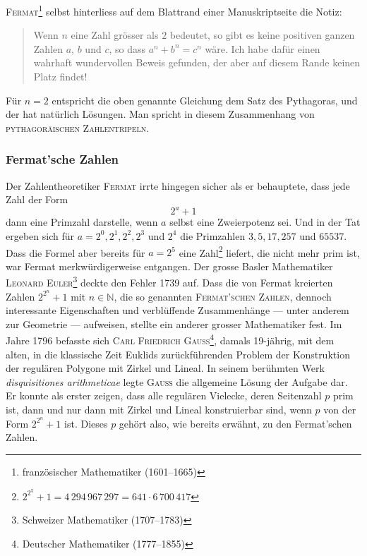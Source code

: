 \documentclass[%
11pt,%
twoside,%
titlepage,%
german,%
headsepline%
]{scrartcl}
\begin{document}
\textsc{Fermat}\footnote{französischer Mathematiker (1601--1665)} selbst hinterliess auf dem Blattrand einer Manuskriptseite die Notiz:
\begin{quote}
    Wenn $n$ eine Zahl grösser als $2$ bedeutet, so gibt es keine positiven ganzen Zahlen $a$, $b$ und $c$, so dass $a^n+b^n=c^n$ wäre. Ich habe dafür einen wahrhaft wundervollen Beweis gefunden, der aber auf diesem Rande keinen Platz findet!
\end{quote}

\begin{bem}
    Für $n=2$ entspricht die oben genannte Gleichung dem Satz des Pythagoras, und der hat natürlich Lösungen. Man spricht in diesem Zusammenhang von \textsc{pythagoräischen Zahlentripeln}.
\end{bem}

\subsubsection{Fermat'sche Zahlen}
Der Zahlentheoretiker \textsc{Fermat} irrte hingegen sicher als er behauptete, dass jede Zahl der Form
$$2^a+1$$
dann eine Primzahl darstelle, wenn $a$ selbst eine Zweierpotenz sei. Und in der Tat ergeben sich für $a=2^0,2^1,2^2,2^3$ und $2^4$ die Primzahlen $3,5,17,257$ und $65537$. Dass die Formel aber bereits für $a=2^5$ eine Zahl\footnote{$2^{2^5}+1=4\,294\,967\,297=641\cdot6\,700\,417$} liefert, die nicht mehr prim ist, war Fermat merkwürdigerweise entgangen. Der grosse Basler Mathematiker \textsc{Leonard Euler}\footnote{Schweizer Mathematiker (1707--1783)} deckte den Fehler 1739 auf. Dass die von Fermat kreierten Zahlen
$2^{2^n}+1$ mit $n\in\mathbb{N}$, die so genannten \textsc{Fermat'schen Zahlen}, dennoch interessante Eigenschaften und verblüffende Zusammenhänge --- unter anderem zur Geometrie --- aufweisen, stellte ein anderer grosser Mathematiker fest. Im Jahre 1796 befasste sich  \textsc{Carl Friedrich Gauss}\footnote{Deutscher Mathematiker (1777--1855)}, damals 19-jährig, mit dem alten, in die klassische Zeit Euklids zurückführenden Problem der Konstruktion der regulären Polygone mit Zirkel und Lineal. In seinem berühmten Werk \emph{disquisitiones arithmeticae} legte \textsc{Gauss} die allgemeine Lösung der Aufgabe dar. Er konnte als erster zeigen, dass alle regulären Vielecke, deren Seitenzahl $p$ prim ist, dann und nur dann mit Zirkel und Lineal konstruierbar sind, wenn $p$ von der Form $2^{2^n}+1$ ist. Dieses $p$ gehört also, wie bereits erwähnt, zu den Fermat'schen Zahlen.
\end{document}
